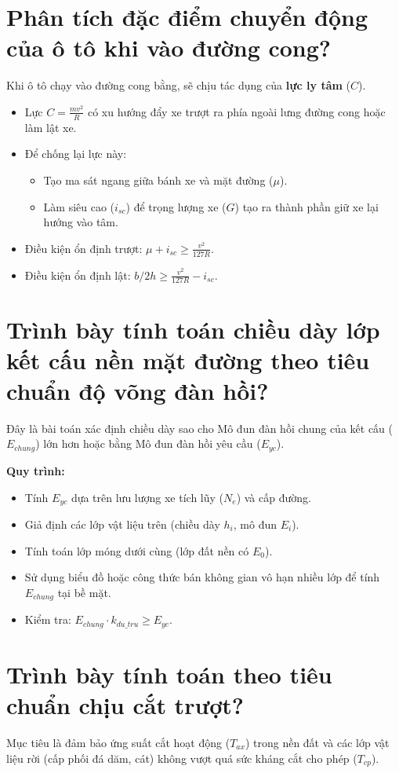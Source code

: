 \documentclass[12pt,a4paper]{article}
\begin{document}
\section{Phân tích đặc điểm chuyển động của ô tô khi vào đường cong?}
Khi ô tô chạy vào đường cong bằng, sẽ chịu tác dụng của \textbf{lực ly tâm} ($C$).
\begin{itemize}
    \item Lực $C = \frac{m v^2}{R}$ có xu hướng đẩy xe trượt ra phía ngoài lưng đường cong hoặc làm lật xe.
    \item Để chống lại lực này:
        \begin{itemize}
            \item Tạo ma sát ngang giữa bánh xe và mặt đường ($\mu$).
            \item Làm siêu cao ($i_{sc}$) để trọng lượng xe ($G$) tạo ra thành phần giữ xe lại hướng vào tâm.
        \end{itemize}
    \item Điều kiện ổn định trượt: $\mu + i_{sc} \ge \frac{v^2}{127R}$.
    \item Điều kiện ổn định lật: $b/2h \ge \frac{v^2}{127R} - i_{sc}$.
\end{itemize}

\section{Trình bày tính toán chiều dày lớp kết cấu nền mặt đường theo tiêu chuẩn độ võng đàn hồi?}
Đây là bài toán xác định chiều dày sao cho Mô đun đàn hồi chung của kết cấu ($E_{chung}$) lớn hơn hoặc bằng Mô đun đàn hồi yêu cầu ($E_{yc}$).

\textbf{Quy trình:}
\begin{itemize}
    \item Tính $E_{yc}$ dựa trên lưu lượng xe tích lũy ($N_e$) và cấp đường.
    \item Giả định các lớp vật liệu trên (chiều dày $h_i$, mô đun $E_i$).
    \item Tính toán lớp móng dưới cùng (lớp đất nền có $E_0$).
    \item Sử dụng biểu đồ hoặc công thức bán không gian vô hạn nhiều lớp để tính $E_{chung}$ tại bề mặt.
    \item Kiểm tra: $E_{chung} \cdot k_{du\_tru} \ge E_{yc}$.
\end{itemize}

\section{Trình bày tính toán theo tiêu chuẩn chịu cắt trượt?}
Mục tiêu là đảm bảo ứng suất cắt hoạt động ($T_{ax}$) trong nền đất và các lớp vật liệu rời (cấp phối đá dăm, cát) không vượt quá sức kháng cắt cho phép ($T_{cp}$).
\end{document}
